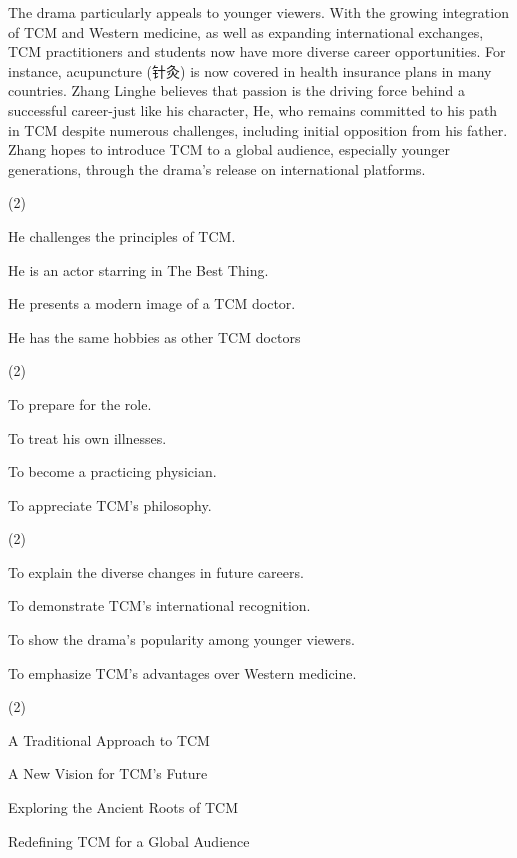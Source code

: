 \documentclass{英语试卷}
\begin{document}
\par The drama particularly appeals to younger viewers. With the growing integration of TCM and Western medicine, as well as expanding international exchanges, TCM practitioners and students now have more diverse career opportunities. For instance, acupuncture (针灸) is now covered in health insurance plans in many countries. Zhang Linghe believes that passion is the driving force behind a successful career-just like his character, He, who remains committed to his path in TCM despite numerous challenges, including initial opposition from his father. Zhang hopes to introduce TCM to a global audience, especially younger generations, through the drama's release on international platforms.\par
{}
\begin{choices}(2)
  \item He challenges the principles of TCM.
  \item He is an actor starring in The Best Thing.
  \item He presents a modern image of a TCM doctor.
  \item He has the same hobbies as other TCM doctors
\end{choices}
\begin{choices}(2)
  \item To prepare for the role.
  \item To treat his own illnesses.
  \item To become a practicing physician.
  \item To appreciate TCM's philosophy.
\end{choices}
\begin{choices}(2)
  \item To explain the diverse changes in future careers.
  \item To demonstrate TCM's international recognition.
  \item To show the drama's popularity among younger viewers.
  \item To emphasize TCM's advantages over Western medicine.
\end{choices}
\begin{choices}(2)
  \item A Traditional Approach to TCM
  \item A New Vision for TCM's Future
  \item Exploring the Ancient Roots of TCM
  \item Redefining TCM for a Global Audience
\end{choices}
\end{document}
